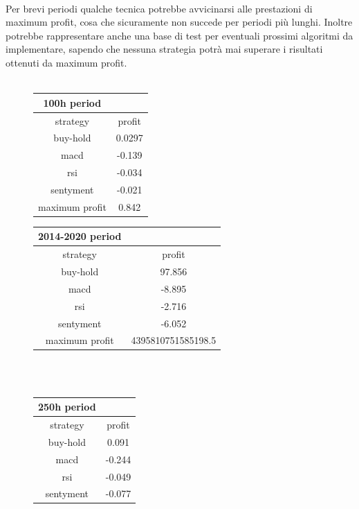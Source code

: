 \documentclass[a4paper,12pt]{report}
\begin{document}
\begin{fig}
\\ Per brevi periodi qualche tecnica potrebbe avvicinarsi alle prestazioni di maximum profit, cosa che sicuramente non succede per periodi più lunghi. Inoltre potrebbe rappresentare anche una base di test per eventuali prossimi algoritmi da implementare, sapendo che nessuna strategia potrà mai superare i risultati ottenuti da maximum profit.\\~\\
\begin{fig}
	\begin{subfigure}{\linewidth}
		\begin{tabular}{||c c ||} 
			\hline\hline
			\textbf{100h period} & \\
			\hline\hline
			strategy & profit \\ [0.5ex] 
			\hline\hline
			buy-hold &  0.0297 \\
			\hline
			macd & -0.139 \\
			\hline
			rsi & -0.034 \\
			\hline
			sentyment & -0.021 \\
			\hline
			maximum profit & 0.842 \\ [1ex]
			\hline\hline
		\end{tabular}
		\begin{tabular}{||c c ||} 
			\hline\hline
			\textbf{2014-2020 period} & \\
			\hline\hline
			strategy & profit \\ [0.5ex] 
			\hline\hline
			buy-hold & 97.856 \\
			\hline
			macd & -8.895 \\
			\hline
			rsi & -2.716 \\
			\hline
			sentyment & -6.052 \\ 
			\hline
			maximum profit & 4395810751585198.5 \\ [1ex]
			\hline\hline
		\end{tabular}
		\\~\\
		\begin{tabular}{||c c ||} 
			\hline\hline
			\textbf{250h period} & \\
			\hline\hline
			strategy & profit \\ [0.5ex] 
			\hline\hline
			buy-hold & 0.091 \\
			\hline
			macd & -0.244 \\
			\hline
			rsi & -0.049 \\
			\hline
			sentyment & -0.077 \\

\end{tabular}
\end{subfigure}
\end{fig}
\end{fig}
\end{document}
